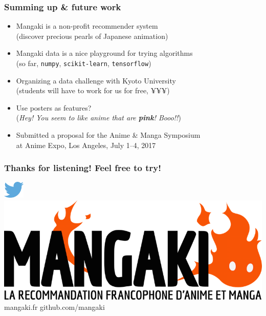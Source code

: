 \documentclass[]{beamer}
\begin{document}
\begin{frame}
  \frametitle{Summing up \& future work}
  \begin{itemize}
    \item Mangaki is a \alert{non-profit} recommender system\\
    \hfill (discover precious pearls of Japanese animation)\\[5mm]
    \item Mangaki data is a \alert{nice playground for trying algorithms}\\
    \hfill (so far, \texttt{numpy}, \texttt{scikit-learn}, \texttt{tensorflow})\\[5mm]
    \item Organizing a \alert{data challenge} with Kyoto University\\
    \hfill (students will have to work for us for free, {\DejaSans ¥¥¥})\\[5mm]
    \item Use posters as features?\\
    \hfill (\emph{Hey! You seem to like anime that are \textbf{pink}! Booo!!})\\[5mm]
    \item Submitted a proposal for the Anime \& Manga Symposium\\
    \hfill at Anime Expo, Los Angeles, July 1--4, 2017
  \end{itemize}
\end{frame}

\begin{frame}
	\frametitle{Thanks for listening! Feel free to try!}
  \centering
  \LARGE
	\includegraphics[width=1cm]{figures/twitter.png}\,\,
  \vspace{5mm}
  \includegraphics[width=\linewidth]{figures/mangaki.png}\\
  mangaki.fr \hfill github.com/mangaki
\end{frame}
\end{document}
